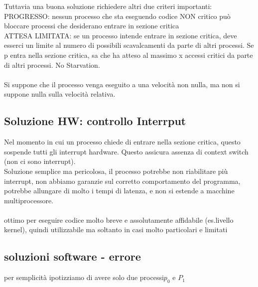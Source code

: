 \documentclass{article}
\begin{document}
Tuttavia una buona soluzione richiedere altri due criteri importanti:\\
PROGRESSO: nessun processo che sta eseguendo codice NON critico può bloccare processi che desiderano entrare in sezione critica\\
ATTESA LIMITATA: se un processo intende entrare in sezione critica, deve esserci un limite al numero di possibili scavalcamenti da parte di altri processi. Se p entra nella sezione critica, sa che ha atteso al massimo x accessi critici da parte di altri processi. No Starvation.\\
\\
Si suppone che il processo venga eseguito a una velocità non nulla, ma non si suppone nulla sulla velocità relativa.
\\
\subsection{Soluzione HW: controllo Interrput}
Nel momento in cui un processo chiede di entrare nella sezione critica, questo sospende tutti gli interrupt hardware. Questo assicura assenza di context switch (non ci sono interrupt). \\
Soluzione semplice ma pericolosa, il processo potrebbe non riabilitare più interrupt, non abbiamo garanzie sul corretto comportamento del programma, potrebbe allungare di molto i tempi di latenza, e non si estende a macchine multiprocessore.\\
\\
ottimo per eseguire codice molto breve e assolutamente affidabile (es.livello kernel), quindi utilizzabile ma soltanto in casi molto particolari e limitati

\subsection{soluzioni software - errore}
per semplicità ipotizziamo di avere solo due processi$p_0$ e $P_1$
\end{document}

